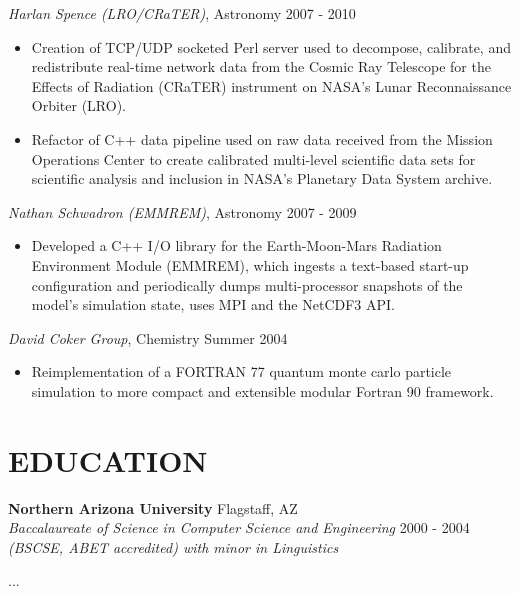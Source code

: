 \documentclass[line,margin]{res}
\begin{document}
\begin{resume}
          {\sl Harlan Spence (LRO/CRaTER)}, Astronomy \hfill 2007 - 2010
          \begin{itemize} \itemsep -2pt
          \item
            Creation of TCP/UDP socketed Perl server used to decompose, calibrate, and redistribute real-time network data from the Cosmic Ray Telescope for the Effects of Radiation (CRaTER) instrument on NASA's Lunar Reconnaissance Orbiter (LRO).
          \item
            Refactor of C++ data pipeline used on raw data received from the Mission Operations Center to create calibrated multi-level scientific data sets for scientific analysis and inclusion in NASA's Planetary Data System archive.
          \end{itemize}

          {\sl Nathan Schwadron (EMMREM)}, Astronomy \hfill 2007 - 2009
          \begin{itemize} \itemsep -2pt
          \item
            Developed a C++ I/O library for the Earth-Moon-Mars Radiation Environment Module (EMMREM), which ingests a text-based start-up configuration and periodically dumps multi-processor snapshots of the model's simulation state, uses MPI and the NetCDF3 API.
          \end{itemize}

          {\sl David Coker Group}, Chemistry \hfill Summer 2004
          \begin{itemize} \itemsep -2pt
          \item
            Reimplementation of a FORTRAN 77 quantum monte carlo particle simulation to more compact and extensible modular Fortran 90 framework.
          \end{itemize}

  \section{EDUCATION}
          {\bf Northern Arizona University} \hfill Flagstaff, AZ\\
          {\sl Baccalaureate of Science in Computer Science and Engineering} \hfill 2000 - 2004\\
          {\sl (BSCSE, ABET accredited) with minor in Linguistics}

          ...

\end{resume}
\end{document}
